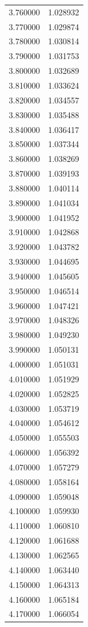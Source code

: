 \begin{tabular}{rr}
3.760000 & 1.028932 \\
3.770000 & 1.029874 \\
3.780000 & 1.030814 \\
3.790000 & 1.031753 \\
3.800000 & 1.032689 \\
3.810000 & 1.033624 \\
3.820000 & 1.034557 \\
3.830000 & 1.035488 \\
3.840000 & 1.036417 \\
3.850000 & 1.037344 \\
3.860000 & 1.038269 \\
3.870000 & 1.039193 \\
3.880000 & 1.040114 \\
3.890000 & 1.041034 \\
3.900000 & 1.041952 \\
3.910000 & 1.042868 \\
3.920000 & 1.043782 \\
3.930000 & 1.044695 \\
3.940000 & 1.045605 \\
3.950000 & 1.046514 \\
3.960000 & 1.047421 \\
3.970000 & 1.048326 \\
3.980000 & 1.049230 \\
3.990000 & 1.050131 \\
4.000000 & 1.051031 \\
4.010000 & 1.051929 \\
4.020000 & 1.052825 \\
4.030000 & 1.053719 \\
4.040000 & 1.054612 \\
4.050000 & 1.055503 \\
4.060000 & 1.056392 \\
4.070000 & 1.057279 \\
4.080000 & 1.058164 \\
4.090000 & 1.059048 \\
4.100000 & 1.059930 \\
4.110000 & 1.060810 \\
4.120000 & 1.061688 \\
4.130000 & 1.062565 \\
4.140000 & 1.063440 \\
4.150000 & 1.064313 \\
4.160000 & 1.065184 \\
4.170000 & 1.066054 \\

\end{tabular}
